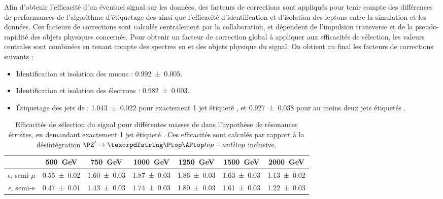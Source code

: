 Afin d'obtenir l'efficacité d'un éventuel signal sur les données, des facteurs de corrections sont appliqués pour tenir compte des différences de performances de l'algorithme d'étiquetage des \Pbottom ainsi que l'efficacité d'identification et d'isolation des leptons entre la simulation et les données. Ces facteurs de corrections sont calculés centralement par la collaboration, et dépendent de l'impulsion transverse et de la pseudo-rapidité des objets physiques concernés. Pour obtenir un facteur de correction global à appliquer aux efficacités de sélection, les valeurs centrales sont combinées en tenant compte des spectres en \pt et \aeta des objets physique du signal. On obtient au final les facteurs de corrections suivants :
\begin{itemize}
  \item Identification et isolation des muons : \num{0.992 \pm 0.005}.
  \item Identification et isolation des électrons : \num{0.982 \pm 0.003}.
  \item Étiquetage des jets de \Pbottom : \num{1.043 \pm 0.022} pour exactement 1 jet étiqueté \Pbottom, et \num{0.927 \pm 0.038} pour au moins deux jets étiquetés \Pbottom.
\end{itemize}

\begin{table}[p!] \centering
  \begin{tabular}{ccccccc} \toprule
    & \SI{500}{\GeV} & \SI{750}{\GeV} & \SI{1000}{\GeV} & \SI{1250}{\GeV} & \SI{1500}{\GeV} & \SI{2000}{\GeV} \\ \midrule
    $\epsilon$, semi-$\mu$ & \num{0.55 \pm 0.02} & \num{1.60 \pm 0.03} & \num{1.87 \pm 0.03} & \num{1.86 \pm 0.03} & \num{1.63 \pm 0.03} & \num{1.13 \pm 0.02} \\
    $\epsilon$, semi-e & \num{0.47 \pm 0.01} & \num{1.43 \pm 0.03} & \num{1.74 \pm 0.03} & \num{1.80 \pm 0.03} & \num{1.61 \pm 0.03} & \num{1.22 \pm 0.03} \\ \bottomrule
  \end{tabular}
  \caption{Efficacités de sélection du signal pour différentes masses de \zprime dans l'hypothèse de résonances étroites, en demandant exactement 1 jet étiqueté \Pbottom. Ces efficacités sont calculés par rapport à la désintégration $\zprime \rightarrow \ttbar$ inclusive.}
  \label{tab:eff_narrow_1b}
\end{table}

